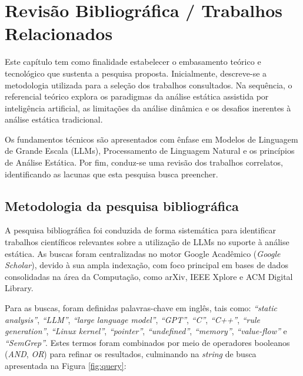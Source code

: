 \documentclass[
    12pt,                %
    openright,           %
    oneside,             %
    a4paper,             %
    english,             %
    brazil               %
]{abntex2}
\begin{document}
\chapter{Revisão Bibliográfica / Trabalhos Relacionados}
\label{cap:revisao}
\par
Este capítulo tem como finalidade estabelecer o embasamento teórico e tecnológico que sustenta a pesquisa proposta.
Inicialmente, descreve-se a metodologia utilizada para a seleção dos trabalhos consultados. Na sequência, o referencial teórico explora os paradigmas da análise estática assistida por inteligência artificial, as limitações da análise dinâmica e os desafios inerentes à análise estática tradicional. 
\par
Os fundamentos técnicos são apresentados com ênfase em Modelos de Linguagem de Grande Escala (LLMs), Processamento de Linguagem Natural e os princípios de Análise Estática. 
Por fim, conduz-se uma revisão dos trabalhos correlatos, identificando as lacunas que esta pesquisa busca preencher.

\section{Metodologia da pesquisa bibliográfica}
\label{sec:metodologia_pesquisa_bib}
\par
A pesquisa bibliográfica foi conduzida de forma sistemática para identificar trabalhos científicos relevantes sobre a utilização de LLMs no suporte à análise estática. 
As buscas foram centralizadas no motor Google Acadêmico (\textit{Google Scholar}), devido à sua ampla indexação, com foco principal em bases de dados consolidadas na área da Computação, como arXiv, IEEE Xplore e ACM Digital Library.
\par
Para as buscas, foram definidas palavras-chave em inglês, tais como: \textit{``static analysis''}, \textit{``LLM''}, \textit{``large language model''}, \textit{``GPT''}, \textit{``C''}, \textit{``C++''}, \textit{``rule generation''}, \textit{``Linux kernel''}, \textit{``pointer''}, \textit{``undefined''}, \textit{``memory''}, \textit{``value-flow''} e \textit{``SemGrep''}. 
Estes termos foram combinados por meio de operadores booleanos (\textit{AND}, \textit{OR}) para refinar os resultados, culminando na \textit{string} de busca apresentada na Figura \ref{fig:query}:
\end{document}

